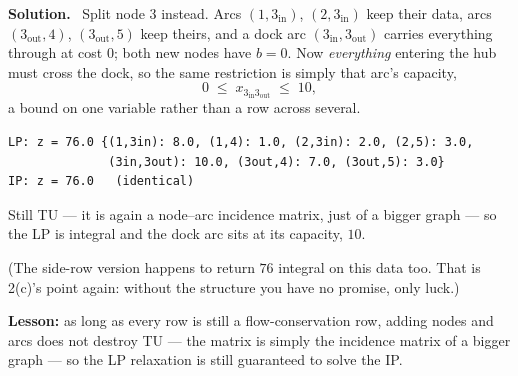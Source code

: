 \documentclass[10pt]{article}
\newenvironment{solution}
  {\par\smallskip\begingroup\color{solink}\textbf{Solution.}\ }
  {\endgroup\par}
\begin{document}
\begin{parts}
\begin{solution}
Split node 3 instead. Arcs $(1,3_{\mathrm{in}})$, $(2,3_{\mathrm{in}})$ keep their data,
arcs $(3_{\mathrm{out}},4)$, $(3_{\mathrm{out}},5)$ keep theirs, and a dock arc
$(3_{\mathrm{in}}, 3_{\mathrm{out}})$ carries everything through at cost $0$; both new nodes
have $b = 0$. Now \emph{everything} entering the hub must cross the dock, so the same
restriction is simply that arc's capacity,
\[
  0 \;\le\; x_{3_{\mathrm{in}} 3_{\mathrm{out}}} \;\le\; 10 ,
\]
a bound on one variable rather than a row across several.
\begin{center}
\end{center}
\begin{lstlisting}
LP: z = 76.0 {(1,3in): 8.0, (1,4): 1.0, (2,3in): 2.0, (2,5): 3.0,
              (3in,3out): 10.0, (3out,4): 7.0, (3out,5): 3.0}
IP: z = 76.0   (identical)
\end{lstlisting}
Still TU --- it is again a node--arc incidence matrix, just of a bigger graph --- so the LP
is integral and the dock arc sits at its capacity, $10$.

(The side-row version happens to return $76$ integral on this data too. That is 2(c)'s point
again: without the structure you have no promise, only luck.)

\textbf{Lesson:} as long as every row is still a flow-conservation row, adding nodes and arcs
does not destroy TU --- the matrix is simply the incidence matrix of a bigger graph --- so the
LP relaxation is still guaranteed to solve the IP.
\end{solution}
\end{parts}
\end{document}
